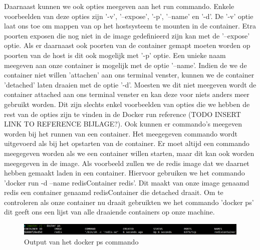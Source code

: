 Daarnaast kunnen we ook opties meegeven aan het run commando. Enkele voorbeelden van deze opties zijn '-v', '--expose', '-p', '--name' en '-d'. De '-v' optie laat ons toe om mappen van op het hostsysteem te mounten in de container. Etra poorten exposen die nog niet in de image gedefinieerd zijn kan met de '--expose' optie. Als er daarnaast ook poorten van de container gemapt moeten worden op poorten van de host is dit ook mogelijk met '-p' optie. Een unieke naam meegeven aan onze container is mogelijk met de optie '--name'. Indien de we de container niet willen 'attachen' aan ons terminal venster, kunnen we de container 'detached' laten draaien met de optie '-d'. Moesten we dit niet meegeven wordt de container attached aan ons terminal venster en kan deze voor niets anders meer gebruikt worden. Dit zijn slechts enkel voorbeelden van opties die we hebben de rest van de opties zijn te vinden in de Docker run reference (TODO INSERT LINK TO REFERENCE BIJLAGE?). Ook kunnen er commando's meegeven worden bij het runnen van een container. Het meegegeven commando wordt uitgevoerd als bij het opstarten van de container. Er moet altijd een commando meegegeven worden als we een container willen starten, maar dit kan ook worden meegegeven in de image. Als voorbeeld zullen we de redis image dat we daarnet hebben gemaakt laden in een container. Hiervoor gebruiken we het commando 'docker run -d --name redisContainer redis'. Dit maakt van onze image genaamd redis een container genaamd redisContainer die detached draait. Om te controleren als onze container nu draait gebruikten we het commando 'docker ps' dit geeft ons een lijst van alle draaiende containers op onze machine. 
 
 
\begin{figure}[!ht]
 	\centering
 	\includegraphics[scale=0.35]{img/dockerps.png}
 	\caption{Output van het docker ps commando}
\end{figure}